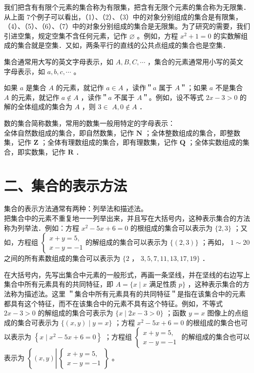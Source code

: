 \documentclass[10pt]{article}
\begin{document}
我们把含有有限个元素的集合称为有限集，把含有无限个元素的集合称为无限集．从上面 7个例子可以看出，（1）、（2）、（3）中的对象分别组成的集合是有限集，（4）、（5）、（6）、（7）中的对象分别组成的集合是无限集。为了研究的需要，我们引进空集，规定空集不含任何元素，记作 \(\varnothing\) 。例如，方程 \(x^{2}+1=0\) 的实数解组成的集合就是空集．又如，两条平行的直线的公共点组成的集合也是空集．

集合通常用大写的英文字母表示，如 \(A, B, C, \cdots\) ，集合的元素通常用小写的英文字母表示，如 \(a, b, c, \cdots\) 。

如果 \(a\) 是集合 \(A\) 的元素，就记作 \(a \in A\) ，读作＂\(a\) 属于 \(A\)＂；如果 \(a\) 不是集合 \(A\) 的元素，就记作 \(a \notin A\) ，读作＂\(a\) 不属于 \(A\)＂。例如，设不等式 \(2 x-3>0\) 的解的全体组成的集合为 \(A\) ，则 \(3 \in\) \(A, 0 \notin A\) ．

数的集合简称数集，常用的数集一般用特定的字母表示：\\
全体自然数组成的集合，即自然数集，记作 \(\mathbf{N}\) ；全体整数组成的集合，即整数集，记作 \(\mathbf{Z}\) ；全体有理数组成的集合，即有理数集，记作 \(\mathbf{Q}\) ；全体实数组成的集合，即实数集，记作 \(\mathbf{R}\) ．

\section*{二、集合的表示方法}
集合的表示方法通常有两种：列举法和描述法。\\
把集合中的元素不重复地一一列举出来，并且写在大括号内，这种表示集合的方法称为列举法．例如：方程 \(x^{2}-5 x+6=0\) 的根组成的集合可以表示为 \(\{2,3\}\) ；又如，方程组 \(\left\{\begin{array}{l}x+y=5, \\ x-y=-1\end{array}\right.\)的解组成的集合可以表示为 \(\{(2,3)\}\) ；再如， \(1 \sim 20\) 之间的所有素数组成的集合可以表示为 \(\{2\) ， \(3,5,7,11,13,17,19\}\) ．

在大括号内，先写出集合中元素的一般形式，再画一条坚线，并在坚线的右边写上集合中所有元素具有的共同特征，即 \(A=\{x \mid x\) 满足性质 \(p\}\) ，这种表示集合的方法称为描述法。这里 ＂集合中所有元素具有的共同特征＂是指在该集合中的元素都具有这个特征，而不在该集合中的元素不具有这个特征。例如，不等式 \(2 x-3>0\) 的解组成的集合可表示为 \(\{x \mid 2 x-3>0\}\) ；函数 \(y=x\) 图像上的点组成的集合可表示为 \(\{(x, y) \mid y=x\}\) ；方程 \(x^{2}-5 x+6=0\) 的根组成的集合也可以表示为 \(\left\{x \mid x^{2}-5 x+6=0\right\}\) ；方程组 \(\left\{\begin{array}{l}x+y=5, \\ x-y=-1\end{array}\right.\) 的解组成的集合也可以表示为 \(\left\{(x, y) \left\lvert\,\left\{\begin{array}{l}x+y=5, \\ x-y=-1\end{array}\right\}\right.\right.\) 。
\end{document}
